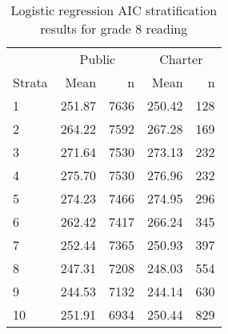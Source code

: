 \begin{table}[ht]
\centering
\caption{Logistic regression AIC stratification results for grade 8 reading} 
\label{g8read-circpsa10AIC}
\begin{tabular}{lrr@{\extracolsep{.2cm}}rr}
  \hline
   & \multicolumn{2}{c}{Public} & \multicolumn{2}{c}{Charter} \\ \cline{2-3} \cline{4-5} Strata & Mean & n & Mean & n \\ \hline
1 & 251.87 & 7636 & 250.42 & 128 \\ 
  2 & 264.22 & 7592 & 267.28 & 169 \\ 
  3 & 271.64 & 7530 & 273.13 & 232 \\ 
  4 & 275.70 & 7530 & 276.96 & 232 \\ 
  5 & 274.23 & 7466 & 274.95 & 296 \\ 
  6 & 262.42 & 7417 & 266.24 & 345 \\ 
  7 & 252.44 & 7365 & 250.93 & 397 \\ 
  8 & 247.31 & 7208 & 248.03 & 554 \\ 
  9 & 244.53 & 7132 & 244.14 & 630 \\ 
  10 & 251.91 & 6934 & 250.44 & 829 \\ 
   \hline
\end{tabular}
\end{table}
